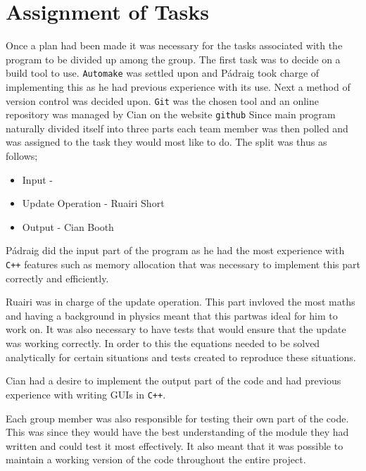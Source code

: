 \section{Assignment of Tasks}
Once a plan had been made it was necessary for the tasks associated with the program to be divided up among the group.
The first task was to decide on a build tool to use.
\texttt{Automake} was settled upon and P\'{a}draig took charge of implementing this as he had previous experience with its use.
Next a method of version control was decided upon.
\texttt{Git} was the chosen tool and an online repository was managed by Cian on the website \texttt{github}
Since main program naturally divided itself into three parts each team member was then polled and was assigned to the task they would most like to do.
The split was thus as follows;
\begin{itemize}
\item Input - \pa
\item Update Operation - Ruairi Short
\item Output - Cian Booth
\end{itemize}

P\'{a}draig did the input part of the program as he had the most experience with \texttt{C++} features such as memory allocation that was necessary to implement this part correctly and efficiently.

Ruairi was in charge of the update operation.
This part invloved the most maths and having a background in physics meant that this partwas ideal for him to work on.
It was also necessary to have tests that would ensure that the update was working correctly.
In order to this the equations needed to be solved analytically for certain situations and tests created to reproduce these situations.

Cian had a desire to implement the output part of the code and had previous experience with writing GUIs in \texttt{C++}.

Each group member was also responsible for testing their own part of the code.
This was since they would have the best understanding of the module they had written and could test it most effectively.
It also meant that it was possible to maintain a working version of the code throughout the entire project.

